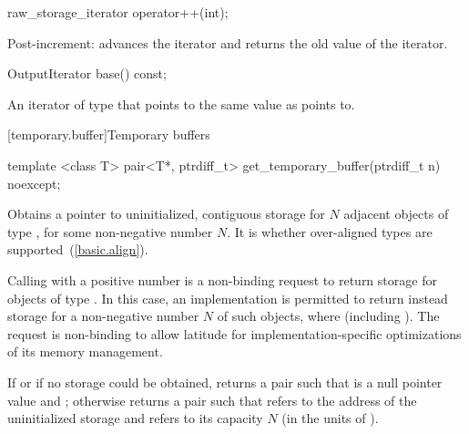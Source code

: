 \begin{itemdecl}
raw_storage_iterator operator++(int);
\end{itemdecl}

\begin{itemdescr}
\pnum
\effects
Post-increment:  advances the iterator and returns the old value of the iterator.
\end{itemdescr}

\begin{itemdecl}
OutputIterator base() const;
\end{itemdecl}

\begin{itemdescr}
\pnum
\returns
An iterator of type  that points to the same value as
 points to.
\end{itemdescr}

[temporary.buffer]{Temporary buffers}

%
\begin{itemdecl}
template <class T>
  pair<T*, ptrdiff_t> get_temporary_buffer(ptrdiff_t n) noexcept;
\end{itemdecl}

\begin{itemdescr}
\pnum
\effects
Obtains a pointer to uninitialized, contiguous storage for $N$ adjacent
objects of type , for some non-negative number $N$.
It is  whether over-aligned types are
supported~(\ref{basic.align}).

\pnum
\remarks
Calling  with a positive number  is
a non-binding request to return storage for  objects of type .
In this case, an implementation is permitted to return instead storage for
a non-negative number $N$ of such objects,
where  (including ).
\enternote The request is non-binding to allow latitude for
implementation-specific optimizations of its memory management. \exitnote

\pnum
\returns
If  or if no storage could be obtained,
returns a pair  such that
 is a null pointer value and ;
otherwise returns a pair  such that
 refers to the address of the uninitialized storage and
 refers to its capacity $N$ (in the units of ).
\end{itemdescr}

